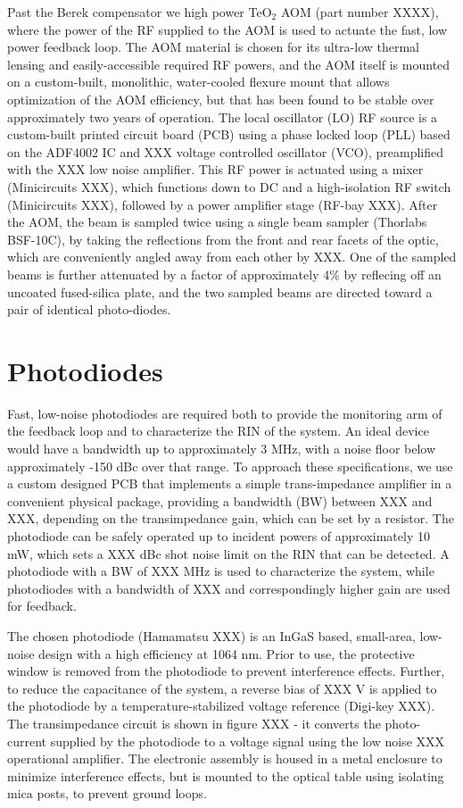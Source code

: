 \documentclass[twocolumn,aps,pra,showpacs,preprintnumbers,bibnotes]{revtex4-1}
\begin{document}
Past the Berek compensator we high power TeO$_2$ AOM (part number XXXX), where the power of the RF supplied to the AOM is used to actuate the fast, low power feedback loop.
The AOM material is chosen for its ultra-low thermal lensing and easily-accessible required RF powers, and the AOM itself is mounted on a custom-built, monolithic, water-cooled flexure mount that allows optimization of the AOM efficiency, but that has been found to be stable over approximately two years of operation.
The local oscillator (LO) RF source is a custom-built printed circuit board (PCB) using a phase locked loop (PLL) based on the ADF4002 IC and XXX voltage controlled oscillator (VCO), preamplified with the XXX low noise amplifier. 
This RF power is actuated using a mixer (Minicircuits XXX), which functions down to DC and a high-isolation RF switch (Minicircuits XXX), followed by a power amplifier stage (RF-bay XXX). After the AOM, the beam is sampled twice using a single beam sampler (Thorlabs BSF-10C), by taking the reflections from the front and rear facets of the optic, which are conveniently angled away from each other by XXX.
One of the sampled beams is further attenuated by a factor of approximately 4\% by reflecing off an uncoated fused-silica plate, and the two sampled beams are directed toward a pair of identical photo-diodes. 


\section{Photodiodes}
Fast, low-noise photodiodes are required both to provide the monitoring arm of the feedback loop and to characterize the RIN of the system.
An ideal device would have a bandwidth up to approximately 3 MHz, with a noise floor below approximately -150 dBc over that range.
To approach these specifications, we use a custom designed PCB that implements a simple trans-impedance amplifier in a convenient physical package, providing a bandwidth (BW) between XXX and XXX, depending on the transimpedance gain, which can be set by a resistor. 
The photodiode can be safely operated up to incident powers of approximately 10 mW, which sets a XXX dBc shot noise limit on the RIN that can be detected.
A photodiode with a BW of XXX MHz is used to characterize the system, while photodiodes with a bandwidth of XXX and correspondingly higher gain are used for feedback.

The chosen photodiode (Hamamatsu XXX) is an InGaS based, small-area, low-noise design with a high efficiency at 1064 nm.
Prior to use, the protective window is removed from the photodiode to prevent interference effects.
Further, to reduce the capacitance of the system, a reverse bias of XXX V is applied to the photodiode by a temperature-stabilized voltage reference (Digi-key XXX).
The transimpedance circuit is shown in figure XXX - it converts the photo-current supplied by the photodiode to a voltage signal using the low noise XXX operational amplifier. 
The electronic assembly is housed in a metal enclosure to minimize interference effects, but is mounted to the optical table using isolating mica posts, to prevent ground loops. 
\end{document}

